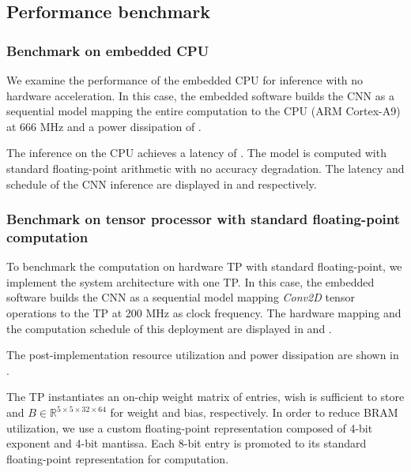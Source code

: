 \subsection{Performance benchmark}
\subsubsection{Benchmark on embedded CPU}

We examine the performance of the embedded CPU for inference with no hardware acceleration. In this case, the embedded software builds the CNN as a sequential model mapping the entire computation to the CPU (ARM Cortex-A9) at 666 MHz and a power dissipation of .

The inference on the CPU achieves a latency of . The model is computed with standard floating-point arithmetic with no accuracy degradation. The latency and schedule of the CNN inference are displayed in  and  respectively.

\subsubsection{Benchmark on tensor processor with standard floating-point computation}
To benchmark the computation on hardware TP with standard floating-point, we implement the system architecture with one TP. In this case, the embedded software builds the CNN as a sequential model mapping \emph{Conv2D} tensor operations to the TP at 200 MHz as clock frequency. The hardware mapping and the computation schedule of this deployment are displayed in  and .

The post-implementation resource utilization and power dissipation are shown in .

The TP instantiates an on-chip weight matrix of  entries, wish is sufficient to store  and $B\in\mathbb{R}^{5\times 5\times 32\times 64}$ for weight and bias, respectively. In order to reduce BRAM utilization, we use a custom floating-point representation composed of 4-bit exponent and 4-bit mantissa. Each 8-bit entry is promoted to its standard floating-point representation for computation.



